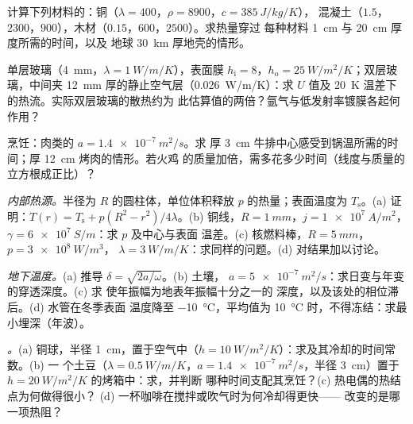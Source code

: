 \begin{exercise}[$\star$]\label{exo:b2:heat-conduction:2}
计算下列材料的：铜（$\lambda = 400$，$\rho = 8900$，$c = \qty{385}{J/kg/K}$），
混凝土（$1.5$，$2300$，$900$），木材（$0.15$，$600$，$2500$）。求热量穿过
每种材料 \qty{1}{cm} 与 \qty{20}{cm} 厚度所需的时间，以及
地球 \qty{30}{km} 厚地壳的情形。
\end{exercise}

\begin{exercise}[$\star$]\label{exo:b2:heat-conduction:3}
单层玻璃（\qty{4}{mm}，$\lambda = \qty{1}{W/m/K}$），表面膜 $h_{\text{i}}
= 8$，$h_{\text{o}} = \qty{25}{W/m^2/K}$；双层玻璃，中间夹 \qty{12}{mm}
厚的静止空气层（\qty{0.026}{W/m/K}）：求 $U$ 值及
\qty{20}{K} 温差下的热流。实际双层玻璃的散热约为
此估算值的两倍？氩气与低发射率镀膜各起何作用？
\end{exercise}

\begin{exercise}[$\star$]\label{exo:b2:heat-conduction:4}
烹饪：肉类的 $a = \qty{1.4e-7}{m^2/s}$。求
厚 \qty{3}{cm} 牛排中心感受到锅温所需的时间；厚 \qty{12}{cm} 烤肉的情形。若火鸡
的质量加倍，需多花多少时间（线度与质量的
立方根成正比）？
\end{exercise}

\begin{exercise}[$\star\star$]\label{exo:b2:heat-conduction:5}
\emph{内部热源。}半径为 $R$ 的圆柱体，单位体积释放 $p$
的热量；表面温度为 $T_{\text{s}}$。(a) 证明：$T(r) = T_{\text{s}} +
p(R^2 - r^2)/4\lambda$。(b) 铜线，$R = \qty{1}{mm}$，$j =
\qty{1e7}{A/m^2}$，$\gamma = \qty{6e7}{S/m}$：求 $p$ 及中心与表面
温差。(c) 核燃料棒，$R = \qty{5}{mm}$，$p = \qty{3e8}{W/m^3}$，
$\lambda = \qty{3}{W/m/K}$：求同样的问题。(d) 对结果加以讨论。
\end{exercise}

\begin{exercise}[$\star\star$]\label{exo:b2:heat-conduction:6}
\emph{地下温度。}(a) 推导 $\delta = \sqrt{2a/\omega}$。(b) 土壤，
$a = \qty{5e-7}{m^2/s}$：求日变与年变的穿透深度。(c) 求
使年振幅为地表年振幅十分之一的
深度，以及该处的相位滞后。(d) 水管在冬季表面
温度降至 \qty{-10}{\celsius}，平均值为
\qty{10}{\celsius} 时，不得冻结：求最小埋深（年波）。
\end{exercise}

\begin{exercise}[$\star\star$]\label{exo:b2:heat-conduction:7}
\emph{。}(a) 铜球，半径 \qty{1}{cm}，置于空气中（$h =
\qty{10}{W/m^2/K}$）：求及其冷却的时间常数。(b) 一
个土豆（$\lambda = \qty{0.5}{W/m/K}$，$a = \qty{1.4e-7}{m^2/s}$，半径
\qty{3}{cm}）置于 $h = \qty{20}{W/m^2/K}$ 的烤箱中：求，并判断
哪种时间支配其烹饪？(c) 热电偶的热结点为何做得很小？
(d) 一杯咖啡在搅拌或吹气时为何冷却得更快——
改变的是哪一项热阻？
\end{exercise}

